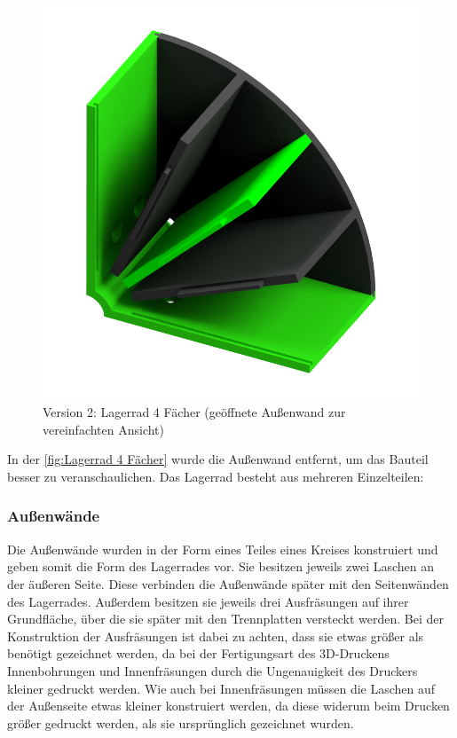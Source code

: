 \begin{figure}[H]
    \centering
    \includegraphics[scale=0.5,page=1]{fig/mech/LagerradSingle}
    \caption{Version 2: Lagerrad 4 Fächer (geöffnete Außenwand zur vereinfachten Ansicht)}
    \label{fig:Lagerrad 4 Fächer}
\end{figure}


In der \autoref{fig:Lagerrad 4 Fächer} wurde die Außenwand entfernt, um das Bauteil besser zu veranschaulichen.
Das Lagerrad besteht aus mehreren Einzelteilen:

\subsubsection{Außenwände}
Die Außenwände wurden in der Form eines Teiles eines Kreises konstruiert und geben somit die Form des Lagerrades vor.
Sie besitzen jeweils zwei Laschen an der äußeren Seite.
Diese verbinden die Außenwände später mit den Seitenwänden des Lagerrades.
Außerdem besitzen sie jeweils drei Ausfräsungen auf ihrer Grundfläche, über die sie später mit den Trennplatten versteckt werden.
Bei der Konstruktion der Ausfräsungen ist dabei zu achten, dass sie etwas größer als benötigt gezeichnet werden, da bei der
Fertigungsart des 3D-Druckens Innenbohrungen und Innenfräsungen durch die Ungenauigkeit des Druckers kleiner gedruckt werden.
Wie auch bei Innenfräsungen müssen die Laschen auf der Außenseite etwas kleiner konstruiert werden, da diese widerum beim
Drucken größer gedruckt werden, als sie ursprünglich gezeichnet wurden.


